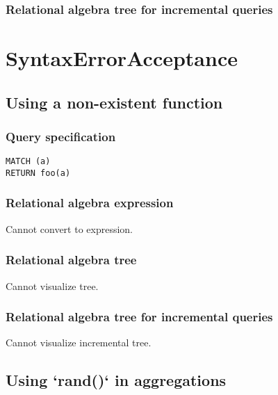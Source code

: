 \subsubsection*{Relational algebra tree for incremental queries}


\section{SyntaxErrorAcceptance}

\subsection{Using a non-existent function}

\subsubsection*{Query specification}

\begin{lstlisting}
MATCH (a)
RETURN foo(a)
\end{lstlisting}

\subsubsection*{Relational algebra expression}

Cannot convert to expression.

\subsubsection*{Relational algebra tree}

Cannot visualize tree.

\subsubsection*{Relational algebra tree for incremental queries}

Cannot visualize incremental tree.

\subsection{Using `rand()` in aggregations}


